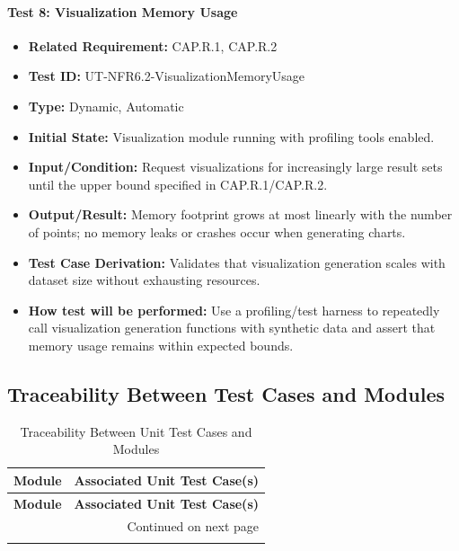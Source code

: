 \documentclass[12pt, titlepage]{article}
\begin{document}
\begin{flushleft}
\paragraph{Test 8: Visualization Memory Usage}
\begin{itemize}
    \item \textbf{Related Requirement:} CAP.R.1, CAP.R.2
    \item \textbf{Test ID:} UT-NFR6.2-VisualizationMemoryUsage
    \item \textbf{Type:} Dynamic, Automatic
    \item \textbf{Initial State:} Visualization module running with profiling tools enabled.
    \item \textbf{Input/Condition:} Request visualizations for increasingly large result sets until the upper bound specified in CAP.R.1/CAP.R.2.
    \item \textbf{Output/Result:} Memory footprint grows at most linearly with the number of points; no memory leaks or crashes occur when generating charts.
    \item \textbf{Test Case Derivation:} Validates that visualization generation scales with dataset size without exhausting resources.
    \item \textbf{How test will be performed:} Use a profiling/test harness to repeatedly call visualization generation functions with synthetic data and assert that memory usage remains within expected bounds.
\end{itemize}

\subsection{Traceability Between Test Cases and Modules}


\renewcommand{\arraystretch}{1.2}
\begin{longtable}{|p{5cm}|p{12cm}|}
\caption{Traceability Between Unit Test Cases and Modules}
\label{tab:unit-traceability} \\
\hline
\textbf{Module} & \textbf{Associated Unit Test Case(s)} \\
\hline
\endfirsthead
\hline
\textbf{Module} & \textbf{Associated Unit Test Case(s)} \\
\hline
\endhead
\hline \multicolumn{2}{r}{{Continued on next page}} \\
\endfoot
\hline
\endlastfoot


\end{longtable}
\end{flushleft}
\end{document}
